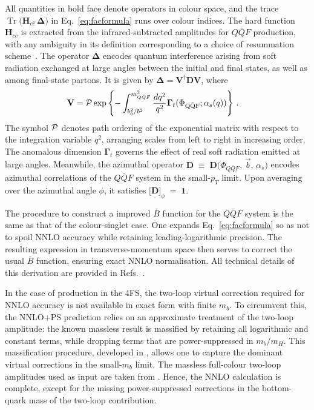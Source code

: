 \documentclass[11pt,a4paper]{article}
\DeclareMathOperator{\Tr}{Tr}
\begin{document}
All quantities in bold face denote operators in colour space, and the trace $\Tr\bigl({\mathbf H}_{c\bar{c}}\,{\mathbf \Delta}\bigr)$
in Eq.~\eqref{eq:facformula} runs over colour indices.  The hard function \({\mathbf H}_{c\bar{c}}\) is extracted from the infrared-subtracted amplitudes for \(Q\bar{Q}F\) production, with any ambiguity in its definition corresponding to a choice of resummation scheme~\cite{Bozzi:2005wk}.  The operator \({\mathbf \Delta}\) encodes quantum interference arising from soft radiation exchanged at large angles between the initial and final states, as well as among final-state partons. It is given by ${\mathbf \Delta}={\mathbf V}^\dagger{\mathbf D}{\mathbf V}$, where
\begin{align}
\label{eq:soft}
{\mathbf V} &= {\cal
  P}\exp\left\{-\int_{b_0^2/b^2}^{m_{Q\bar{Q}F}^2}\frac{dq^2}{q^2}{\mathbf
  \Gamma}_t(\Phi_{\rm Q\bar{Q}F};\alpha_s(q))\right\}\,.%
\end{align}
The symbol \({\cal P}\) denotes path ordering of the exponential matrix with respect to the integration variable \(q^{2}\), arranging scales from left to right in increasing order.  The anomalous dimension \(\mathbf{\Gamma}_{t}\) governs the effect of real soft radiation emitted at large angles.  Meanwhile, the azimuthal operator $\mathbf{D} \;\equiv\; \mathbf{D}\bigl(\Phi_{Q\bar{Q}F},\,\vec{b},\,\alpha_{s}\bigr)$
encodes azimuthal correlations of the \(Q\bar{Q}F\) system in the small-\(p_{T}\) limit.  Upon averaging over the azimuthal angle \(\phi\), it satisfies
$\bigl[\mathbf{D}\bigr]_{\phi} \;=\; \mathbf{1}$.

The procedure to construct a \minnlo{} improved \(\bar{B}\) function for the \(Q\bar{Q}F\) system is the same as that of the colour-singlet case.  One expands Eq.~\eqref{eq:facformula} so as not to spoil NNLO accuracy while retaining leading-logarithmic precision.  The resulting expression in transverse-momentum space then serves to correct the usual \(\bar{B}\) function, ensuring exact NNLO normalisation.  All technical details of this derivation are provided in Refs.~\cite{mazzitelli:2020jio,mazzitelli:2021mmm,mazzitelli:2024ura,Biello:2024pgo}.

In the case of \bbH{} production in the 4FS, the two-loop virtual correction required for NNLO accuracy is not available in exact form with finite \(m_b\). To circumvent this, the NNLO+PS prediction relies on an approximate treatment of the two-loop amplitude: the known massless result is massified by retaining all logarithmic and constant terms, while dropping terms that are power-suppressed in \(m_b / m_{H}\). This massification procedure, developed in , allows one to capture the dominant virtual corrections in the small-\(m_b\) limit. The massless full-colour two-loop amplitudes used as input are taken from . Hence, the NNLO calculation is complete, except for the missing power-suppressed corrections in the bottom-quark mass of the two-loop contribution.
\end{document}
